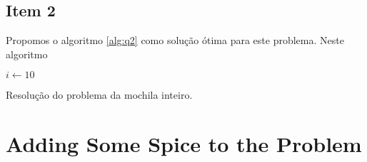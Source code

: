 \documentclass[a4paper, 11pt]{article}
\begin{document}
\subsection{Item 2}

\iffalse
If the greedy algorithm does not guarantee optimality, provide an alternative optimal
algorithm and analyze its computational complexity.
\fi

Propomos o algoritmo \ref{alg:q2} como solução ótima para este problema. Neste algoritmo 

\begin{algorithm}
\begin{algorithmic}
\STATE {}
\STATE $i \gets 10$

\end{algorithmic}

\iffalse
function integer_knapsack(itens, n, W)
  # Initialize the data structures
  SV = ZeroedMatrix(n + 1, W + 1)
  SI = ZeroedMatrix(n + 1, W + 1)

  # Compute the optimum value for each cell
  for i in 



  for i in range(1, n + 1): # O(nW)
    for w in range(W + 1):
      item_w = itens[i - 1].weight
      item_v = itens[i - 1].value
      sack_with_last_item = sack_value[i - 1][w]
      if item_w > w:
        sack_value[i][w] = sack_with_last_item
      else:
        sack_with_this_item = sack_value[i - 1][w - item_w] + item_v
        if sack_with_this_item > sack_with_last_item:
          sack_value[i][w] = sack_with_this_item
          sack_itens[i][w] = True
        else:
          sack_value[i][w] = sack_with_last_item
  selected_itens = []
  curr_w = W
  for i in reversed(range(1, n + 1)): # O(n)
    item = itens[i - 1]
    if sack_itens[i][curr_w]:
      curr_w -= item.weight
      selected_itens.append(SelectedItem(item, 1))
  return selected_itens
\fi

\caption{Resolução do problema da mochila inteiro.}
\label{alg:q2}
\end{algorithm}

\section{Adding Some Spice to the Problem}

\iffalse
Implement the proposed algorithm, and verify if its theoretical complexity is attained, in
practice, on the benchmark instances provided with the project.
\fi
\end{document}
